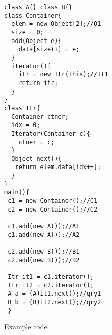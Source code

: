 \begin{figure}
	\centering

	\begin{multicols}{2}
\begin{subfigure}[t]{1.5\columnwidth}
	\begin{multicols}{2}
	\begin{lstlisting}[basicstyle=\small\ttfamily]
class A{} class B{}
class Container{
  elem = new Object[2];//O1
  size = 0;
  add(Object e){
    data[size++] = e;
  }
  iterator(){
    itr = new Itr(this);//It1
    return itr;
  } 
}
class Itr{
  Container ctner; 
  idx = 0;
  Iterator(Container c){
    ctner = c;
  }
  Object next(){
   return elem.data[idx++];
  }
}
main(){
 c1 = new Container();//C1
 c2 = new Container();//C2

 c1.add(new A());//A1
 c1.add(new A());//A2
  
 c2.add(new B());//B1
 c2.add(new B());//B2

 Itr it1 = c1.iterator();
 Itr it2 = c2.iterator();
 A a = (A)it1.next();//qry1
 B b = (B)it2.next();//qry2
 }
\end{lstlisting}
\end{multicols}
\caption{Example code}
\label{fig:example}
\end{subfigure}
\begin{flushright}
\begin{subfigure}[t]{0.5\columnwidth}
	\begin{center}
\end{center}
\end{subfigure}
\end{flushright}
\end{multicols}
\end{figure}
